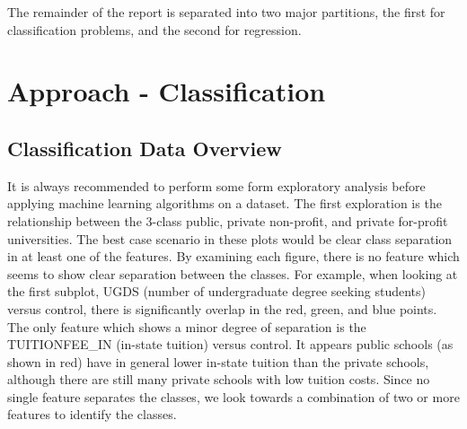 \documentclass[10pt]{article}
\begin{document}
The remainder of the report is separated into two major partitions, the first for classification problems, and the second for regression.
    
\section{Approach - Classification}     
    
\subsection{Classification Data Overview}

It is always recommended to perform some form exploratory analysis before applying machine learning algorithms on a dataset. The first exploration is the relationship between the 3-class public, private non-profit, and private for-profit universities. The best case scenario in these plots would be clear class separation in at least one of the features. By examining each figure, there is no feature which seems to show clear separation between the classes. For example, when looking at the first subplot, UGDS (number of undergraduate degree seeking students) versus control, there is significantly overlap in the red, green, and blue points. The only feature which shows a minor degree of separation is the TUITIONFEE\_IN (in-state tuition) versus control. It appears public schools (as shown in red) have in general lower in-state tuition than the private schools, although there are still many private schools with low tuition costs. Since no single feature separates the classes, we look towards a combination of two or more features to identify the classes.\\
\end{document}
